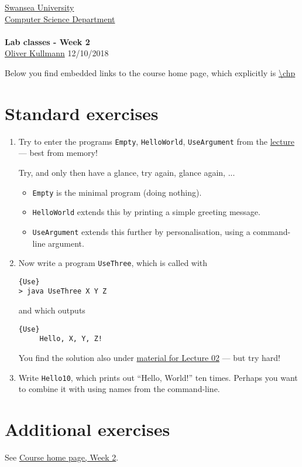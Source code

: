 \documentclass[11pt]{article}
\newcommand{\Java}{\lstset{language=Java,keywordstyle=\bfseries,breaklines,breakindent=30pt}}
\begin{document}
\begin{center}
  \href{http://www.swan.ac.uk/}{Swansea University}\\
  \href{http://www.swan.ac.uk/compsci/}{Computer Science Department}\\[1ex]
  \href{\chp}{\module}\\[1ex]
  \textbf{Lab classes - Week 2}\\
  \href{http://cs.swan.ac.uk/~csoliver}{Oliver Kullmann} 12/10/2018
\end{center}

Below you find embedded links to the course home page, which explicitly is \url{\chp}

\section{Standard exercises}
\label{sec:stdex}

\Java

\begin{enumerate}
\item Try to enter the programs \texttt{Empty}, \texttt{HelloWorld}, \texttt{UseArgument} from the \href{\chp\#LecturesWeek02}{lecture} --- best from memory!
  \begin{center}
    Try, and only then have a glance, try again, glance again, ...
  \end{center}
  \begin{itemize}
  \item \texttt{Empty} is the minimal program (doing nothing).
  \item \texttt{HelloWorld} extends this by printing a simple greeting message.
  \item \texttt{UseArgument} extends this further by personalisation, using a command-line argument.
  \end{itemize}
\item Now write a program \texttt{UseThree}, which is called with
  \begin{lstlisting}{Use}
> java UseThree X Y Z
  \end{lstlisting}
   and which outputs
   \begin{lstlisting}{Use}
     Hello, X, Y, Z!
   \end{lstlisting}
   You find the solution also under \href{\chp\#LecturesWeek02}{material for Lecture 02} --- but try hard!
 \item Write \texttt{Hello10}, which prints out ``Hello, World!'' ten times. Perhaps you want to combine it with using names from the command-line.
\end{enumerate}


\section{Additional exercises}
\label{sec:addex}

See \href{\chp\#ExercisesWeek02}{Course home page, Week 2}.
\end{document}
